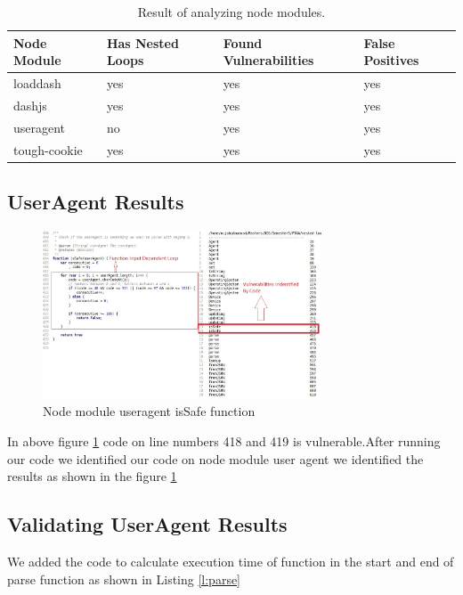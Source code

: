 \documentclass[authoryear,preprint]{sigplanconf}
\begin{document}
\begin{table}[h]
\small
\begin{tabular}{ |p{1.9cm}||p{1.9cm}|p{1.9cm}|p{1.9cm}|  }
 \hline
 \textbf{Node Module}&\textbf{Has Nested Loops}&\textbf{Found Vulnerabilities} &\textbf{False Positives}\\
 \hline
loaddash&yes&yes &yes  \\
\hline 
dashjs&yes&yes&yes  \\
\hline 
useragent &no&yes &yes  \\
\hline 
 tough-cookie & yes&yes &yes \\
\hline 

\end{tabular}

\caption[Comparison]{\label{t:Comparison} Result of analyzing node modules.}
\end{table}
\subsection{UserAgent Results}
\begin{figure}[ht]
\centering
\includegraphics[height=5cm]{figures/useragent-isSafe}
\caption[Code analysis performed on node module useragent isSafe function]{\label{f:isSafe}Node module useragent isSafe function}
\end{figure}

In above figure \ref{f:isSafe} code on line numbers 418 and 419 is vulnerable.After running our code we identified our code on node module user agent we identified  the results as shown in the figure \ref{f:isSafe}

\subsection{Validating UserAgent Results}
We added the code to calculate execution time of function in the start and end of parse function as shown in Listing \ref{l:parse}
 
\end{document}
